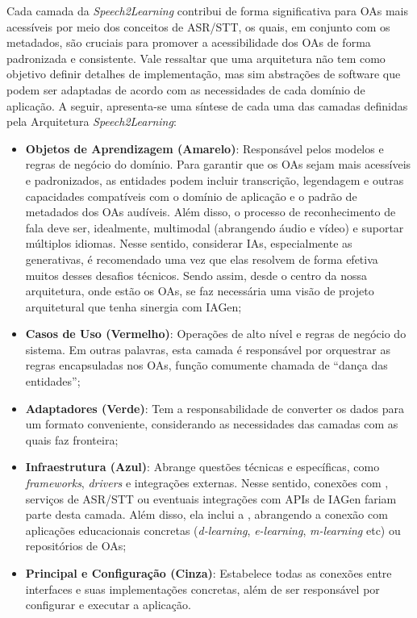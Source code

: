 Cada camada da \textit{Speech2Learning} contribui de forma significativa para OAs mais acessíveis por meio dos conceitos de ASR/STT, os quais, em conjunto com os metadados, são cruciais para promover a acessibilidade dos OAs de forma padronizada e consistente. Vale ressaltar que uma arquitetura não tem como objetivo definir detalhes de implementação, mas sim abstrações de software que podem ser adaptadas de acordo com as necessidades de cada domínio de aplicação. A seguir, apresenta-se uma síntese de cada uma das camadas definidas pela Arquitetura \textit{Speech2Learning}:

\begin{itemize}
\item \textbf{Objetos de Aprendizagem (Amarelo)}: Responsável pelos modelos e regras de negócio do domínio. Para garantir que os OAs sejam mais acessíveis e padronizados, as entidades podem incluir transcrição, legendagem e outras capacidades compatíveis com o domínio de aplicação e o padrão de metadados dos OAs audíveis. Além disso, o processo de reconhecimento de fala deve ser, idealmente, multimodal (abrangendo áudio e vídeo) e suportar múltiplos idiomas. Nesse sentido, considerar IAs, especialmente as generativas, é recomendado uma vez que elas resolvem de forma efetiva muitos desses desafios técnicos. Sendo assim, desde o centro da nossa arquitetura, onde estão os OAs, se faz necessária uma visão de projeto arquitetural que tenha sinergia com IAGen;
\item \textbf{Casos de Uso (Vermelho)}: Operações de alto nível e regras de negócio do sistema. Em outras palavras, esta camada é responsável por orquestrar as regras encapsuladas nos OAs, função comumente chamada de ``dança das entidades'';
\item \textbf{Adaptadores (Verde)}: Tem a responsabilidade de converter os dados para um formato conveniente, considerando as necessidades das camadas com as quais faz fronteira;
\item \textbf{Infraestrutura (Azul)}: Abrange questões técnicas e específicas, como \textit{frameworks}, \textit{drivers} e integrações externas. Nesse sentido, conexões com , serviços de ASR/STT ou eventuais integrações com APIs de IAGen fariam parte desta camada. Além disso, ela inclui a , abrangendo a conexão com aplicações educacionais concretas (\textit{d-learning}, \textit{e-learning}, \textit{m-learning} etc) ou repositórios de OAs;
\item \textbf{Principal e Configuração (Cinza)}: Estabelece todas as conexões entre interfaces e suas implementações concretas, além de ser responsável por configurar e executar a aplicação.
\end{itemize}

